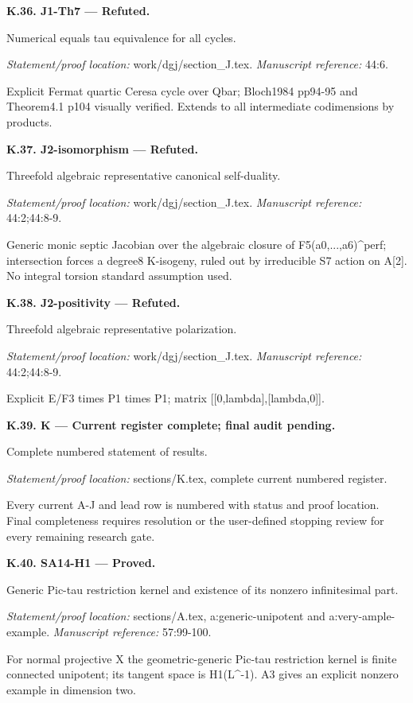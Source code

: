 \par\medskip\noindent\textbf{K.36. J1-Th7 --- Refuted.}\par
Numerical equals tau equivalence for all cycles.
\par\emph{Statement/proof location:} work/dgj/section\_J.tex.
\emph{Manuscript reference:} 44:6.
\par Explicit Fermat quartic Ceresa cycle over Qbar; Bloch1984 pp94-95 and Theorem4.1 p104 visually verified. Extends to all intermediate codimensions by products.
\par\medskip\noindent\textbf{K.37. J2-isomorphism --- Refuted.}\par
Threefold algebraic representative canonical self-duality.
\par\emph{Statement/proof location:} work/dgj/section\_J.tex.
\emph{Manuscript reference:} 44:2;44:8-9.
\par Generic monic septic Jacobian over the algebraic closure of F5(a0,...,a6)\textasciicircum{}perf; intersection forces a degree8 K-isogeny, ruled out by irreducible S7 action on A[2]. No integral torsion standard assumption used.
\par\medskip\noindent\textbf{K.38. J2-positivity --- Refuted.}\par
Threefold algebraic representative polarization.
\par\emph{Statement/proof location:} work/dgj/section\_J.tex.
\emph{Manuscript reference:} 44:2;44:8-9.
\par Explicit E/F3 times P1 times P1; matrix [[0,lambda],[lambda,0]].
\par\medskip\noindent\textbf{K.39. K --- Current register complete; final audit pending.}\par
Complete numbered statement of results.
\par\emph{Statement/proof location:} sections/K.tex, complete current numbered register.
\par Every current A-J and lead row is numbered with status and proof location. Final completeness requires resolution or the user-defined stopping review for every remaining research gate.
\par\medskip\noindent\textbf{K.40. SA14-H1 --- Proved.}\par
Generic Pic-tau restriction kernel and existence of its nonzero infinitesimal part.
\par\emph{Statement/proof location:} sections/A.tex, a:generic-unipotent and a:very-ample-example.
\emph{Manuscript reference:} 57:99-100.
\par For normal projective X the geometric-generic Pic-tau restriction kernel is finite connected unipotent; its tangent space is H1(L\textasciicircum{}-1). A3 gives an explicit nonzero example in dimension two.
